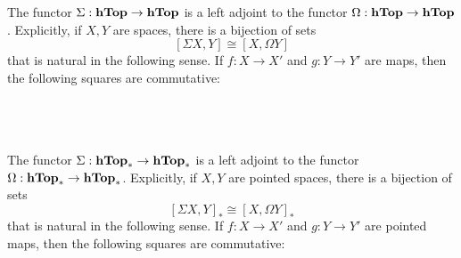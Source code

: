 \documentclass[a4paper]{article}
\begin{document}
\begin{thm}{}{} The functor $\Sigma:\bold{hTop}\to\bold{hTop}$ is a left adjoint to the functor $\Omega:\bold{hTop}\to\bold{hTop}$. Explicitly, if $X,Y$ are spaces, there is a bijection of sets $$[\Sigma X,Y]\cong[X,\Omega Y]$$ that is natural in the following sense. If $f:X\to X'$ and $g:Y\to Y'$ are maps, then the following squares are commutative: \\~\\
\\~\\
\end{thm}

\begin{thm}{}{} The functor $\Sigma:\bold{hTop}_\ast\to\bold{hTop}_\ast$ is a left adjoint to the functor $\Omega:\bold{hTop}_\ast\to\bold{hTop}_\ast$. Explicitly, if $X,Y$ are pointed spaces, there is a bijection of sets $$[\Sigma X,Y]_\ast\cong[X,\Omega Y]_\ast$$ that is natural in the following sense. If $f:X\to X'$ and $g:Y\to Y'$ are pointed maps, then the following squares are commutative: \\~\\
\\~\\
\end{thm}
\end{document}
